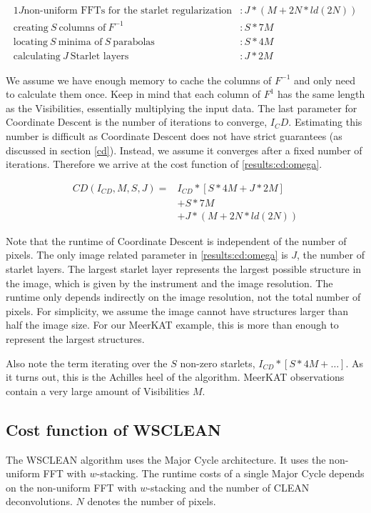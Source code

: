 \begin{alignat*}{1}
J \text{non-uniform FFTs for the starlet regularization} &: J*(M + 2N*ld(2N))\\
\text{creating} \:S\: \text{columns of}\: F^{-1} &: S*7M\\
\text{locating} \:S\: \text{minima of} \:S\: \text{parabolas} &: S*4M\\
\text{calculating} \:J\: \text{Starlet layers} &: J * 2M
\end{alignat*}

We assume we have enough memory to cache the columns of $F^{-1}$ and only need to calculate them once. Keep in mind that each column of $F^{1}$ has the same length as the Visibilities, essentially multiplying the input data. The last parameter for Coordinate Descent is the number of iterations to converge, $I_CD$. Estimating this number is difficult as Coordinate Descent does not have strict guarantees (as discussed in section \ref{cd}). Instead, we assume it converges after a fixed number of iterations. Therefore we arrive at the cost function of \eqref{results:cd:omega}.

\begin{equation}\label{results:cd:omega}
\begin{aligned}
	CD(I_{CD}, M, S, J) = &I_{CD} * [S * 4M + J * 2M]\\
		&+  S*7M\\
		&+ J*(M + 2N*ld(2N))
\end{aligned}
\end{equation}

Note that the runtime of Coordinate Descent is independent of the number of pixels. The only image related parameter in \eqref{results:cd:omega} is $J$, the number of starlet layers. The largest starlet layer represents the largest possible structure in the image, which is given by the instrument and the image resolution. The runtime only depends indirectly on the image resolution, not the total number of pixels. For simplicity, we assume the image cannot have structures larger than half the image size. For our MeerKAT example, this is more than enough to represent the largest structures.

Also note the term iterating over the $S$ non-zero starlets, $ I_{CD} * [S * 4M +\ldots]$. As it turns out, this is the Achilles heel of the algorithm. MeerKAT observations contain a very large amount of Visibilities $M$.

\subsection{Cost function of WSCLEAN}
The WSCLEAN algorithm uses the Major Cycle architecture. It uses the non-uniform FFT with $w$-stacking. The runtime costs of a single Major Cycle depends on the non-uniform FFT with $w$-stacking and the number of CLEAN deconvolutions. $N$ denotes the number of pixels.

